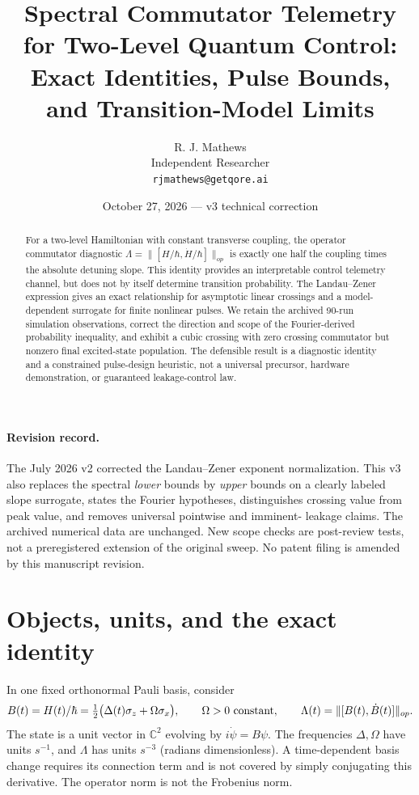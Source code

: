 \documentclass[11pt]{article}
\title{Spectral Commutator Telemetry for Two-Level Quantum Control:\\Exact Identities, Pulse Bounds, and Transition-Model Limits}
\author{R. J. Mathews\\Independent Researcher\\\texttt{rjmathews@getqore.ai}}
\date{October 27, 2026 --- v3 technical correction}
\begin{document}
\maketitle
\begin{abstract}
For a two-level Hamiltonian with constant transverse coupling, the operator
commutator diagnostic $\Lambda=\|[H/\hbar,\dot H/\hbar]\|_{op}$ is exactly
one half the coupling times the absolute detuning slope. This identity provides
an interpretable control telemetry channel, but does not by itself determine
transition probability. The Landau--Zener expression gives an exact
relationship for asymptotic linear crossings and a model-dependent surrogate
for finite nonlinear pulses. We retain the archived 90-run simulation
observations, correct the direction and scope of the Fourier-derived
probability inequality, and exhibit a cubic crossing with zero crossing
commutator but nonzero final excited-state population. The defensible result
is a diagnostic identity and a constrained pulse-design heuristic, not a
universal precursor, hardware demonstration, or guaranteed leakage-control law.
\end{abstract}

\paragraph{Revision record.}
The July 2026 v2 corrected the Landau--Zener exponent normalization. This v3
also replaces the spectral \emph{lower} bounds by \emph{upper} bounds on a
clearly labeled slope surrogate, states the Fourier hypotheses, distinguishes
crossing value from peak value, and removes universal pointwise and imminent-
leakage claims. The archived numerical data are unchanged. New scope checks
are post-review tests, not a preregistered extension of the original sweep.
No patent filing is amended by this manuscript revision.

\section{Objects, units, and the exact identity}
In one fixed orthonormal Pauli basis, consider
\begin{equation}
 B(t)=H(t)/\hbar=\tfrac12\bigl(\Delta(t)\sigma_z+\Omega\sigma_x\bigr),
 \qquad \Omega>0\ \hbox{constant},\qquad
 \Lambda(t)=\|[B(t),\dot B(t)]\|_{op}.
 \label{eq:definition}
\end{equation}
The state is a unit vector in $\mathbb C^2$ evolving by
$i\dot\psi=B\psi$. The frequencies $\Delta,\Omega$ have units $s^{-1}$,
and $\Lambda$ has units $s^{-3}$ (radians dimensionless). A time-dependent
basis change requires its connection term and is not covered by simply
conjugating this derivative. The operator norm is not the Frobenius norm.
\end{document}
